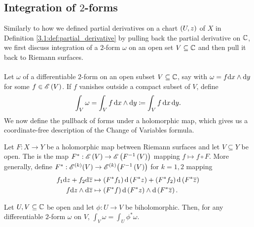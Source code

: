 \documentclass[../Moduli_Spaces_of_Riemann_Surfaces.tex]{subfiles}
\begin{document}
    \subsection{Integration of $2$-forms}
    Similarly to how we defined partial derivatives on a chart $\left(U,z\right)$ of $X$ in Definition \ref{3.1:def:partial_derivative} by pulling back the partial derivative on $\mathbb{C}$, we first discuss integration of a $2$-form $\omega$ on an open set $V\subseteq\mathbb{C}$ and then pull it back to Riemann surfaces.\\\ \\
    Let $\omega$ of a differentiable $2$-form on an open subset $V\subseteq\mathbb{C}$, say with $\omega=f\mathrm{d} x\wedge\mathrm{d} y$ for some $f\in\mathscr{E}\left(V\right)$. If $f$ vanishes outside a compact subset of $V$, define
    \begin{equation*}
        \int_V\omega=\int_Vf\,\mathrm{d} x\wedge\mathrm{d} y\coloneqq\int_Vf\,\mathrm{d} x\,\mathrm{d} y.
    \end{equation*}
    We now define the pullback of forms under a holomorphic map, which gives us a coordinate-free description of the Change of Variables formula.
    \begin{definition}
        Let $F:X\to Y$ be a holomorphic map between Riemann surfaces and let $V\subseteq Y$ be open. The  is the map $F^\ast:\mathscr{E}\left(V\right)\to\mathscr{E}\left(F^{-1}\left(V\right)\right)$ mapping $f\mapsto f\circ F$. More generally, define $F^\ast:\mathscr{E}^{\left(k\right)}\!\left(V\right)\to\mathscr{E}^{\left(k\right)}\!\left(F^{-1}\left(V\right)\right)$ for $k=1,2$ mapping
        \begin{equation*}
            \begin{aligned}
                f_1\mathrm{d} z+f_2\mathrm{d}\overline{z}&\mapsto\left(F^\ast f_1\right)\mathrm{d}\left(F^\ast z\right)+\left(F^\ast f_2\right)\mathrm{d}\left(F^\ast\overline{z}\right) \\
                f\mathrm{d} z\wedge\mathrm{d}\overline{z}&\mapsto\left(F^\ast f\right)\mathrm{d}\left(F^\ast z\right)\wedge\mathrm{d}\left(F^\ast\overline{z}\right).
            \end{aligned}
        \end{equation*}
    \end{definition}
    \begin{proposition}\label{3.1:prp:change_of_variables_in_C}
        Let $U,V\subseteq\mathbb{C}$ be open and let $\phi:U\to V$ be biholomorphic. Then, for any differentiable $2$-form $\omega$ on $V$, $\int_V\omega=\int_U\phi^\ast\omega$.
    \end{proposition}
\end{document}

